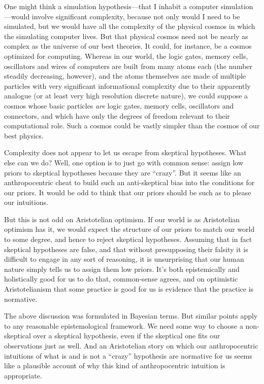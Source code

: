 One might think a simulation hypothesis---that I inhabit a computer simulation---would involve significant complexity,
because not only would I need to be simulated, but we would have all the complexity of the physical cosmos in which the
simulating computer lives. But that physical cosmos need not be nearly as complex as the universe of our best theories.
It could, for instance, be a cosmos optimized for computing. Whereas in our world, the logic gates, memory cells, 
oscillators and wires of computers are built from many atoms each (the number steadily decreasing, however), and the atoms themselves
are made of multiple particles with very significant informational complexity due to their apparently analogue (or at least
very high resolution discrete nature), we could suppose a cosmos whose basic particles \textit{are} logic gates, memory
cells, oscillators and connectors, and which have only the degrees of freedom relevant to their computational role. Such a 
cosmos could be vastly simpler than the cosmos of our best physics. 

Complexity does not appear to let us escape from skeptical hypotheses. What else can we do? Well, one option is to just
go with common sense: assign low priors to skeptical hypotheses because they are ``crazy''.
But it seems like an anthropocentric cheat to 
build such an anti-skeptical bias into the conditions for our priors. It would be odd to think that our priors should
be such as to please our intuitions.

But this is not odd on Aristotelian optimism. If our world is as Aristotelian optimism has it, we would expect
the structure of our priors to match our world to some degree, and hence to reject skeptical hypotheses. Assuming
that in fact skeptical hypotheses are false, and that without presupposing their falsity it is difficult to engage
in any sort of reasoning, it is unsurprising that our human nature simply tells us to assign them low priors. 
It's both epistemically and holistically good for us to do that, common-sense agrees, and on optimistic Aristotelianism 
that some practice is good for us is evidence that the practice is normative.

The above discussion was formulated in Bayesian terms. But similar points apply to any reasonable epistemological framework.
We need some way to choose a non-skeptical over a skeptical hypothesis, even if the skeptical one fits our observations just 
as well. And an Aristotelian story on which our anthropocentric intuitions of what is and is not a ``crazy'' hypothesis 
are normative for us seems like a plausible account of why this kind of anthropocentric intuition is appropriate.

